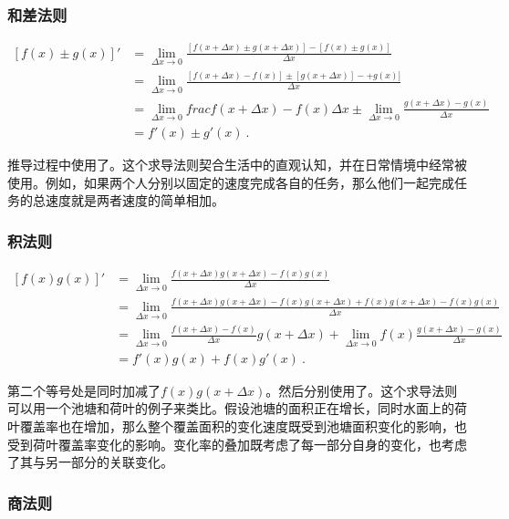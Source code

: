 \subsubsection{和差法则}

\begin{equation}
\begin{split}
\left[f(x)\pm g(x)\right]'&=\lim_{\Delta x\to 0}\frac{[f(x+\Delta x)\pm g(x+\Delta x)]-[f(x)\pm g(x)]}{\Delta x}\\
&=\lim_{\Delta x\to 0}\frac{[f(x+\Delta x)-f(x)]\pm [g(x+\Delta x)]-+g(x)]}{\Delta x}\\
&=\lim_{\Delta x\to 0}frac{f(x+\Delta x)-f(x)}{\Delta x}\pm\lim_{\Delta x\to 0}\frac{g(x+\Delta x)-g(x)}{\Delta x}\\
&=f'(x)\pm g'(x)~.
\end{split}
\end{equation}

推导过程中使用了。这个求导法则契合生活中的直观认知，并在日常情境中经常被使用。例如，如果两个人分别以固定的速度完成各自的任务，那么他们一起完成任务的总速度就是两者速度的简单相加。

\subsubsection{积法则}

\begin{equation}
\begin{split}
\left[f(x) g(x)\right]'&=\lim_{\Delta x\to 0}\frac{f(x+\Delta x) g(x+\Delta x)-f(x) g(x)}{\Delta x}\\
&=\lim_{\Delta x\to 0}\frac{f(x+\Delta x) g(x+\Delta x)-f(x) g(x+\Delta x)+f(x) g(x+\Delta x)-f(x) g(x)}{\Delta x}\\
&=\lim_{\Delta x\to 0}\frac{f(x+\Delta x)-f(x)}{\Delta x} g(x+\Delta x)+\lim_{\Delta x\to 0}f(x)\frac{g(x+\Delta x)-g(x)}{\Delta x}\\
&=f'(x)g(x)+f(x) g'(x)~.
\end{split}
\end{equation}

第二个等号处是同时加减了$f(x) g(x+\Delta x)$。然后分别使用了。这个求导法则可以用一个池塘和荷叶的例子来类比。假设池塘的面积正在增长，同时水面上的荷叶覆盖率也在增加，那么整个覆盖面积的变化速度既受到池塘面积变化的影响，也受到荷叶覆盖率变化的影响。变化率的叠加既考虑了每一部分自身的变化，也考虑了其与另一部分的关联变化。

\subsubsection{商法则}

